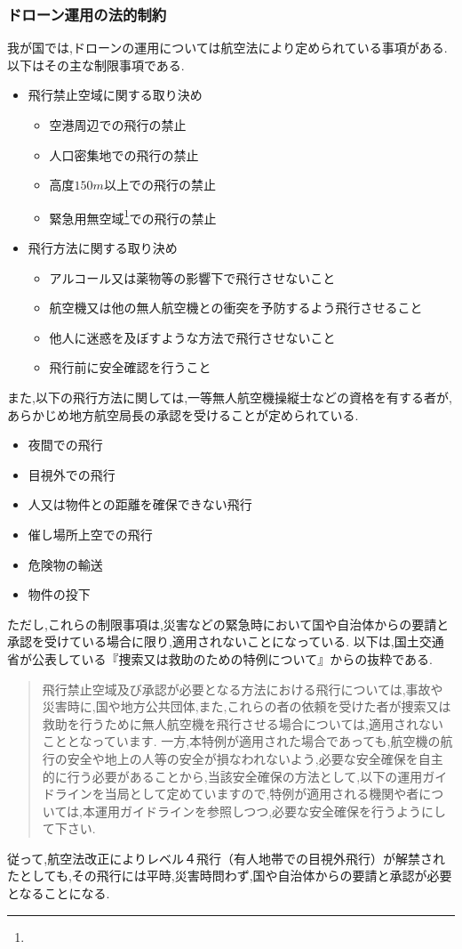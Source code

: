 \documentclass{article}[jsarticle]
\begin{document}
\subsubsection{ドローン運用の法的制約}
我が国では,ドローンの運用については航空法により定められている事項がある.以下はその主な制限事項である.
\begin{itemize}
    \item 飛行禁止空域に関する取り決め
    \begin{itemize}
        \item 空港周辺での飛行の禁止
        \item 人口密集地での飛行の禁止
        \item 高度$150m$以上での飛行の禁止
        \item 緊急用無空域\footnote{}での飛行の禁止
    \end{itemize}
    \item 飛行方法に関する取り決め
    \begin{itemize}
        \item アルコール又は薬物等の影響下で飛行させないこと
        \item 航空機又は他の無人航空機との衝突を予防するよう飛行させること
        \item 他人に迷惑を及ぼすような方法で飛行させないこと
        \item 飛行前に安全確認を行うこと 
    \end{itemize}
\end{itemize}
また,以下の飛行方法に関しては,一等無人航空機操縦士などの資格を有する者が,あらかじめ地方航空局長の承認を受けることが定められている.
\begin{itemize}
    \item 夜間での飛行
    \item 目視外での飛行
    \item 人又は物件との距離を確保できない飛行
    \item 催し場所上空での飛行
    \item 危険物の輸送
    \item 物件の投下
\end{itemize}
ただし,これらの制限事項は,災害などの緊急時において国や自治体からの要請と承認を受けている場合に限り,適用されないことになっている.
以下は,国土交通省が公表している『捜索又は救助のための特例について』からの抜粋である.
\begin{quote}
    飛行禁止空域及び承認が必要となる方法における飛行については,事故や災害時に,国や地方公共団体,また,これらの者の依頼を受けた者が捜索又は救助を行うために無人航空機を飛行させる場合については,適用されないこととなっています.
    一方,本特例が適用された場合であっても,航空機の航行の安全や地上の人等の安全が損なわれないよう,必要な安全確保を自主的に行う必要があることから,当該安全確保の方法として,以下の運用ガイドラインを当局として定めていますので,特例が適用される機関や者については,本運用ガイドラインを参照しつつ,必要な安全確保を行うようにして下さい.
\end{quote}
従って,航空法改正によりレベル４飛行（有人地帯での目視外飛行）が解禁されたとしても,その飛行には平時,災害時問わず,国や自治体からの要請と承認が必要となることになる.
\end{document}
